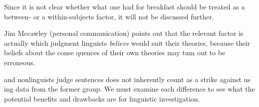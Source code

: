 \setcounter{listWWNumxlleveli}{15}
\begin{listWWNumxlleveli}
\item 
\begin{styleStandard}
Since it is not clear whether what one had for breakfast should be treated as a between- or a within-subjects factor, it will not be discussed further.
\end{styleStandard}


\item 
\begin{styleStandard}
Jim Mccawley (personal communication) points out that the relevant factor is actually which judgment linguists \textit{believe}\textit{ }would suit their theories, because their beliefs about the conse\- quences of their own theories may tum out to be erroneous.
\end{styleStandard}


\end{listWWNumxlleveli}
\clearpage\setcounter{page}{1}\begin{styleStandard}
and nonlinguists judge sentences does not inherently count as a strike against us\- ing data from the former group. We must examine each difference to see what the potential benefits and drawbacks are for linguistic investigation.
\end{styleStandard}


